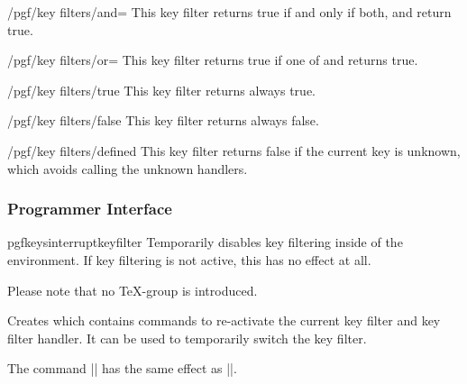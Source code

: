 \begin{key}{/pgf/key filters/and=}
	This key filter returns true if and only if both,  and  return true.
\end{key}

\begin{key}{/pgf/key filters/or=}
	This key filter returns true if one of  and  returns true.
\end{key}

\begin{key}{/pgf/key filters/true}
	This key filter returns always true.
\end{key}

\begin{key}{/pgf/key filters/false}
	This key filter returns always false.
\end{key}

\begin{key}{/pgf/key filters/defined}
	This key filter returns false if the current key is unknown, which avoids calling the unknown handlers.
\end{key}

\subsubsection{Programmer Interface}
\label{section-key-filter-api}%
\begin{plainenvironment}{{pgfkeysinterruptkeyfilter}}%
	Temporarily disables key filtering inside of the environment. If key filtering is not active, this has no effect at all.

	Please note that no \TeX-group is introduced.
\end{plainenvironment}

\begin{command}{\pgfkeyssavekeyfilterstateto{}}
Creates  which contains commands to re-activate the current
key filter and key filter handler. It can be used to temporarily
switch the key filter.
\end{command}

\begin{command}{\pgfkeysinstallkeyfilter{}}%
	The command || has the same effect as ||.
\end{command}

